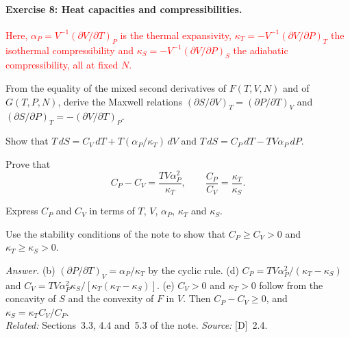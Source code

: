 \documentclass[11pt]{article}      %
\numberwithin{equation}{section}   %
\begin{document}
\paragraph{Exercise 8: Heat capacities and compressibilities.}
\textcolor{red}{Here, $\alpha_P = V^{-1}(\partial V/\partial T)_P$ is the thermal expansivity, $\kappa_T = -V^{-1}(\partial V/\partial P)_T$ the isothermal compressibility and $\kappa_S = -V^{-1}(\partial V/\partial P)_S$ the adiabatic compressibility, all at fixed $N$.}
\begin{parts}
    \item From the equality of the mixed second derivatives of $F(T, V, N)$ and of $G(T, P, N)$, derive the Maxwell relations $(\partial S/\partial V)_T = (\partial P/\partial T)_V$ and $(\partial S/\partial P)_T = -(\partial V/\partial T)_P$.
    \item Show that $T\,dS = C_V\,dT + T(\alpha_P/\kappa_T)\,dV$ and $T\,dS = C_P\,dT - TV\alpha_P\,dP$.
    \item Prove that
    \begin{equation*}
        C_P - C_V = \frac{TV\alpha_P^2}{\kappa_T},
        \qquad
        \frac{C_P}{C_V} = \frac{\kappa_T}{\kappa_S}.
    \end{equation*}
    \item Express $C_P$ and $C_V$ in terms of $T$, $V$, $\alpha_P$, $\kappa_T$ and $\kappa_S$.
    \item Use the stability conditions of the note to show that $C_P \ge C_V > 0$ and $\kappa_T \ge \kappa_S > 0$.
\end{parts}
\textit{Answer.} (b) $(\partial P/\partial T)_V = \alpha_P/\kappa_T$ by the cyclic rule. (d) $C_P = TV\alpha_P^2/(\kappa_T - \kappa_S)$ and $C_V = TV\alpha_P^2\kappa_S/[\kappa_T(\kappa_T - \kappa_S)]$. (e) $C_V > 0$ and $\kappa_T > 0$ follow from the concavity of $S$ and the convexity of $F$ in $V$. Then $C_P - C_V \ge 0$, and $\kappa_S = \kappa_TC_V/C_P$.\\
\textit{Related:} Sections~3.3, 4.4 and~5.3 of the note. \textit{Source:} [D]~2.4.
\end{document}
